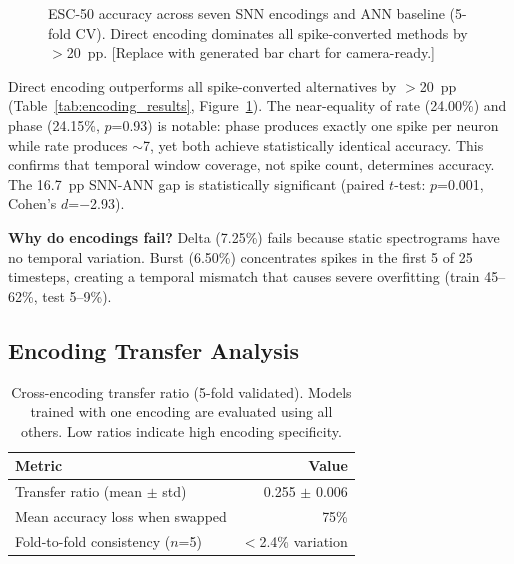 \documentclass[sigconf,nonacm=false]{acmart}
\begin{document}
\begin{figure}[t]
\centering
{}
\caption{ESC-50 accuracy across seven SNN encodings and ANN baseline (5-fold CV). Direct encoding dominates all spike-converted methods by $>$20~pp. [Replace with generated bar chart for camera-ready.]}
\label{fig:encodings}
\end{figure}

Direct encoding outperforms all spike-converted alternatives by $>$20~pp (Table~\ref{tab:encoding_results}, Figure~\ref{fig:encodings}). The near-equality of rate (24.00\%) and phase (24.15\%, $p$=0.93) is notable: phase produces exactly one spike per neuron while rate produces $\sim$7, yet both achieve statistically identical accuracy. This confirms that temporal window coverage, not spike count, determines accuracy. The 16.7~pp SNN-ANN gap is statistically significant (paired $t$-test: $p$=0.001, Cohen's $d$=$-$2.93).

\textbf{Why do encodings fail?} Delta (7.25\%) fails because static spectrograms have no temporal variation. Burst (6.50\%) concentrates spikes in the first 5 of 25 timesteps, creating a temporal mismatch that causes severe overfitting (train 45--62\%, test 5--9\%).

\subsection{Encoding Transfer Analysis}

\begin{table}[t]
\caption{Cross-encoding transfer ratio (5-fold validated). Models trained with one encoding are evaluated using all others. Low ratios indicate high encoding specificity.}
\label{tab:transfer}
\small
\begin{tabular}{@{}lr@{}}
\toprule
Metric & Value \\
\midrule
Transfer ratio (mean $\pm$ std) & 0.255 $\pm$ 0.006 \\
Mean accuracy loss when swapped & 75\% \\
Fold-to-fold consistency ($n$=5) & $<$2.4\% variation \\
\bottomrule
\end{tabular}
\end{table}
\end{document}

